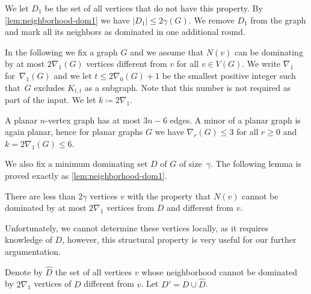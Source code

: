 \begin{tcolorbox}
We let $D_1$ be the set of all vertices that do not have this
property. By \cref{lem:neighborhood-dom1}
we have $|D_1|\leq 2\gamma(G)$. We remove $D_1$ from the
graph and mark all its neighbors as dominated in one additional round.
\end{tcolorbox}


In the following we fix a graph $G$ and we assume that $N(v)$ can be
dominating by at most $2\nabla_1(G)$ vertices different from $v$
for all $v\in V(G)$. We write $\nabla_1$ for~$\nabla_1(G)$ and
we let $t\leq 2\nabla_0(G)+1$ be the smallest positive integer
 such that~$G$ excludes
$K_{t,t}$ as a subgraph. Note that this number is not required
as part of the input. We let $k\coloneq 2\nabla_1$.

\begin{example}
  A planar $n$-vertex graph has at most $3n-6$ edges. A minor of a
  planar graph is again planar, hence for planar graphs $G$ we have $\nabla_r(G) \leq 3$ for all $r\geq 0$ and $k=2\nabla_1(G)\leq 6$.
\end{example}

We also fix a minimum dominating set $D$ of $G$
of size~$\gamma$.
The following lemma is proved exactly as \cref{lem:neighborhood-dom1}.

\begin{lemma}\label{lem:neighborhood-dom2}
There are less than $2\gamma$ vertices $v$ with the property
that $N(v)$ cannot be dominated by at most $2\nabla_1$ vertices
from $D$ and different from $v$.
\end{lemma}

Unfortunately, we cannot determine these vertices locally, as it requires
know\-ledge of $D$, however, this structural property is very useful for
our further argumentation.

\begin{tcolorbox}
Denote by $\hat D$ the set of all vertices $v$
whose neighborhood cannot be dominated
by $2\nabla_1$ vertices of $D$ different from $v$.
Let $D'=D\cup \hat D$.
\end{tcolorbox}

